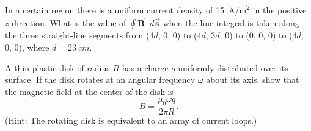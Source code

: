 \documentclass[12pt,letterpaper,boxed,cm]{hmcpset}
\newcommand{\f}[2]{\frac{#1}{#2}}
\begin{document}
\begin{problem}[10]	
	In a certain region there is a uniform current density of \SI{15}{A/m^2} in the positive $z$ direction. What is the value of $\oint \vec{\mathbf{B}}\cdot d\vec{\mathbf{s}}$ when the line integral is taken along the three straight-line segments from ($4d$, 0, 0) to ($4d$, $3d$, 0) to (0, 0, 0) to ($4d$, 0, 0), where $d = \SI{23}{cm}$.
\end{problem}
\begin{solution}
\end{solution}
\newpage

\begin{problem}[33-P8*]	
	A thin plastic disk of radius $R$ has a charge $q$ uniformly distributed over its surface. If the disk rotates at an angular frequency $\omega$ about its axis, show that the magnetic field at the center of the disk is
	\[
		B = \f{\mu_0\omega q}{2\pi R}.
	\]
	(Hint: The rotating disk is equivalent to an array of current loops.)
\end{problem}
\begin{solution}
\end{solution}
\end{document}
